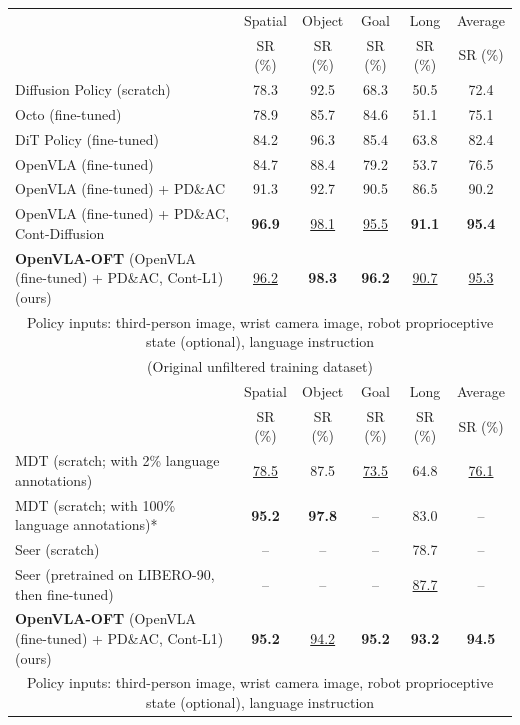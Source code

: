 \documentclass[conference]{IEEEtran}
\begin{document}
\begin{table}[t]
{\begin{tabular}{l|c|c|c|c|c}
\midrule
& Spatial & Object & Goal & Long & Average \\
& SR (\%) & SR (\%) & SR (\%) & SR (\%) & SR (\%) \\
\midrule
Diffusion Policy (scratch) \citep{chi2023diffusion} & 78.3 & 92.5  & 68.3  & 50.5   & 72.4 \\
Octo (fine-tuned) \citep{team2024octo} & 78.9 & 85.7 & 84.6 & 51.1 & 75.1 \\
DiT Policy (fine-tuned) \citep{hou2025diffusiontransformerpolicyscaling} & 84.2 & 96.3 & 85.4 & 63.8 & 82.4 \\
OpenVLA (fine-tuned) \citep{kim2024openvla} & 84.7 & 88.4 & 79.2 & 53.7 & 76.5  \\
OpenVLA (fine-tuned) + PD\&AC & 91.3 & 92.7 & 90.5 & 86.5 & 90.2 \\
OpenVLA (fine-tuned) + PD\&AC, Cont-Diffusion & \textbf{96.9} & \underline{98.1} & \underline{95.5} & \textbf{91.1} & \textbf{95.4} \\
\textbf{OpenVLA-OFT} (OpenVLA (fine-tuned) + PD\&AC, Cont-L1) (ours) & \underline{96.2} & \textbf{98.3} & \textbf{96.2} & \underline{90.7} & \underline{95.3}  \\
\midrule
\multicolumn{6}{c}{Policy inputs: third-person image, wrist camera image, robot proprioceptive state (optional), language instruction} \\
\multicolumn{6}{c}{(Original unfiltered training dataset)} \\
\midrule
& Spatial & Object & Goal & Long & Average \\
& SR (\%) & SR (\%) & SR (\%) & SR (\%) & SR (\%) \\
\midrule
MDT (scratch; with 2\% language annotations) \citep{reuss2024multimodaldiffusiontransformerlearning} & \underline{78.5} & 87.5 & \underline{73.5} & 64.8 & \underline{76.1} \\
MDT (scratch; with 100\% language annotations)* & \textbf{95.2} & \textbf{97.8} & -- & 83.0 & -- \\
Seer (scratch) \citep{tian2024predictive} & -- & -- & -- & 78.7 & -- \\
Seer (pretrained on LIBERO-90, then fine-tuned) \citep{tian2024predictive} & -- & -- & -- & \underline{87.7} & -- \\
\textbf{OpenVLA-OFT} (OpenVLA (fine-tuned) + PD\&AC, Cont-L1) (ours) & \textbf{95.2} & \underline{94.2} & \textbf{95.2} & \textbf{93.2} & \textbf{94.5}  \\
\midrule
\multicolumn{6}{c}{Policy inputs: third-person image, wrist camera image, robot proprioceptive state (optional), language instruction} \\

\end{tabular}}
\end{table}
\end{document}
